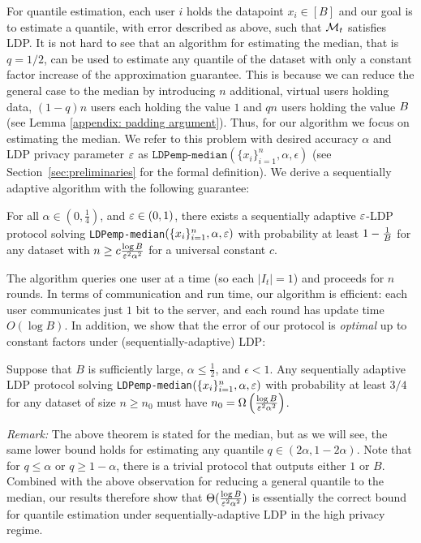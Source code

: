 %
%



%



%

%

%

For quantile estimation, each user $i$ holds the datapoint $x_i\in[B]$ and our goal is to estimate a quantile, with error described as above, such that $\mathcal{M}_t$ satisfies LDP.
It is not hard to see that an algorithm for estimating the median, that is $q=1/2$, can be used to estimate any quantile of the dataset with only a constant factor increase of the approximation guarantee.
This is because we can reduce the general case to the median by introducing $n$ additional, virtual users holding data, $(1-q)n$ users each holding the value $1$ and $qn$ users holding the value $B$ (see Lemma \ref{appendix: padding argument}).
%
%
Thus, for our algorithm we focus on estimating the median. We refer to this problem with desired accuracy $\alpha$ and LDP privacy parameter $\varepsilon$ as $\texttt{LDPemp-median}(\{x_i\}_{i=1}^n, \alpha, \epsilon)$ (see Section~\ref{sec:preliminaries} for the formal definition). 
%
We derive a sequentially adaptive algorithm with the following guarantee:

\begin{theorem}\label{thm:main-emp}
For all $\alpha \in (0,\frac{1}{4})$, and $\varepsilon\in(0,1)$, there exists a sequentially adaptive $\varepsilon$-LDP protocol solving \texttt{LDPemp-median}$(\{x_i\}_{i=1}^n,\alpha,\varepsilon)$ with probability at least $1-\frac{1}{B}$ for any dataset with $n\geq c\frac{\log B}{\varepsilon^2\alpha^2}$ for a universal constant $c$.
\end{theorem}

%
The algorithm queries one user at a time (so each $|I_t| = 1$) and proceeds for $n$ rounds. In terms of communication and run time, our algorithm is efficient: each user communicates just $1$ bit to the server, and each round has update time $O(\log B)$. %
In addition, we show that the error of our protocol is \emph{optimal} up to constant factors under (sequentially-adaptive) LDP:

\begin{theorem}\label{thm:main-lower}
Suppose that $B$ is sufficiently large, $\alpha \leq \frac{1}{2}$, and $\epsilon < 1$. Any sequentially adaptive LDP protocol solving %
\texttt{LDPemp-median}$(\{x_i\}_{i=1}^n,\alpha,\varepsilon)$ with probability at least $3/4$ for any dataset of size $n \geq n_0$ must have $n_0=\Omega\left(\frac{\log B}{\varepsilon^2\alpha^2}\right)$.
\end{theorem}
\emph{Remark:} The above theorem is stated for the median, but as we will see, the same lower bound holds for estimating any quantile $q\in (2\alpha,1-2\alpha)$. 
Note that for $q\leq \alpha$ or $q\geq 1-\alpha$, there is a trivial protocol that outputs either $1$ or $B$. 
Combined with the above observation for reducing a general quantile to the median, our results therefore show that $\Theta(\frac{\log B}{\varepsilon^2\alpha^2})$ is essentially the correct bound for quantile estimation under sequentially-adaptive LDP in the high privacy regime. 

